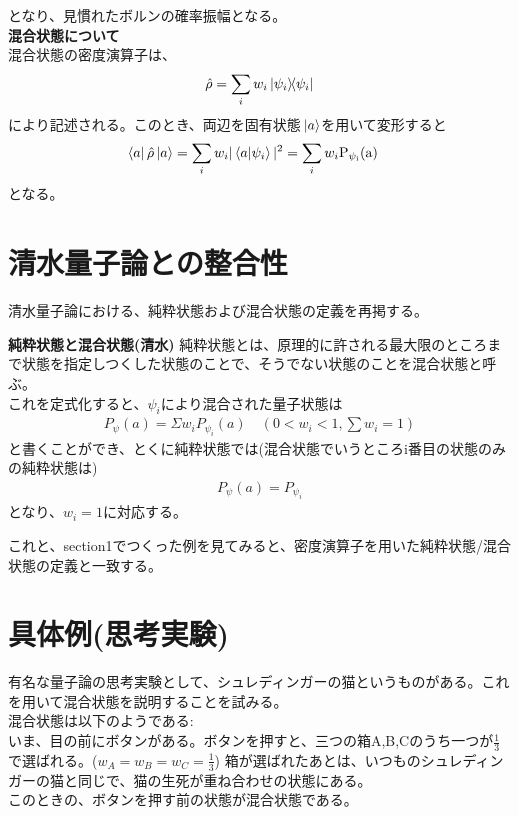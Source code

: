\documentclass[a4paper,11pt]{jsarticle}
\begin{document}
となり、見慣れたボルンの確率振幅となる。\\

\textbf{混合状態について}\\
混合状態の密度演算子は、
\begin{align}
    \hat{\rho} = \sum_{i} w_i\ketbra*{\psi_i}
\end{align}
により記述される。このとき、両辺を固有状態$\ket*{a}$を用いて変形すると\\
\begin{align}
    \bra{a}\hat{\rho}\ket*{a}&
    =\sum_i w_i |\braket{a}{\psi_i}|^2
    =\sum_i w_i \mathrm{P_{\psi_i}(a)}
\end{align}
となる。\\

\section[2]{清水量子論との整合性}
清水量子論における、純粋状態および混合状態の定義を再掲する。\\
\begin{itembox}[l]{\textbf{純粋状態と混合状態(清水)}}
純粋状態とは、原理的に許される最大限のところまで状態を指定しつくした状態のことで、そうでない状態のことを混合状態と呼ぶ。\\
これを定式化すると、$\psi _i$により混合された量子状態は
\begin{align}
P_{\psi}(a)=\Sigma w _i P_{\psi _i}(a)\quad (0<w_i <1,\sum w_i=1)
\end{align}
と書くことができ、とくに純粋状態では(混合状態でいうところi番目の状態のみの純粋状態は)
\begin{align}
P_{\psi}(a)= P_{\psi _i}
\end{align}
となり、$w_i =1$に対応する。\\
\end{itembox}
これと、section1でつくった例を見てみると、密度演算子を用いた純粋状態/混合状態の定義と一致する。\\

\section[3]{具体例(思考実験)}
有名な量子論の思考実験として、シュレディンガーの猫というものがある。これを用いて混合状態を説明することを試みる。\\
混合状態は以下のようである:\\
いま、目の前にボタンがある。ボタンを押すと、三つの箱A,B,Cのうち一つが$\frac{1}{3}$で選ばれる。($w_A=w_B=w_C=\frac{1}{3}$)
箱が選ばれたあとは、いつものシュレディンガーの猫と同じで、猫の生死が重ね合わせの状態にある。\\
このときの、ボタンを押す前の状態が混合状態である。
\end{document}
